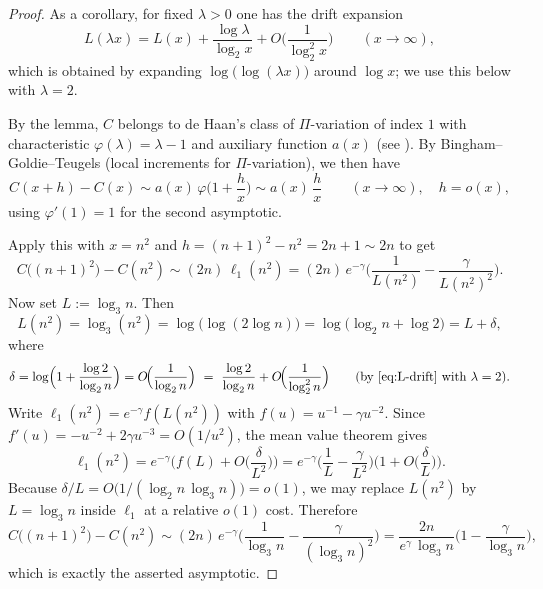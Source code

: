 \begin{proof}
As a corollary, for fixed $\lambda>0$ one has the drift expansion
\begin{equation}\label{eq:L-drift}
 L(\lambda x)=L(x)+\frac{\log\lambda}{\log_2 x}+O\!\Big(\frac{1}{\log_2^2 x}\Big)\qquad(x\to\infty),
\end{equation}
which is obtained by expanding $\log\bigl(\log(\lambda x)\bigr)$ around $\log x$; we use this below with $\lambda=2$.

By the lemma, $C$ belongs to de Haan's class of $\Pi$-variation of index $1$ with characteristic $\varphi(\lambda)=\lambda-1$ and auxiliary function $a(x)$ (see \cite[\S3.7]{BGT1989}). By Bingham--Goldie--Teugels \cite[Th.~3.7.2]{BGT1989} (local increments for $\Pi$-variation), we then have
\[
 C(x+h)-C(x)\sim a(x)\,\varphi\!\Big(1+\frac{h}{x}\Big)\sim a(x)\,\frac{h}{x}
 \qquad (x\to\infty),\quad h=o(x),
\]
using $\varphi'(1)=1$ for the second asymptotic.

Apply this with $x=n^2$ and $h=(n+1)^2-n^2=2n+1\sim 2n$ to get
\[
 C\big((n+1)^2\big)-C(n^2)\sim (2n)\,\ell_1(n^2)
 =(2n)\,e^{-\gamma}\Big(\frac{1}{L(n^2)}-\frac{\gamma}{L(n^2)^2}\Big).
\]
Now set $L:=\log_3 n$. Then
\[
 L(n^2)=\log_3(n^2)=\log\bigl(\log(2\log n)\bigr)=\log\bigl(\log_2 n+\log 2\bigr)
 = L + \delta,
\]
where
\[
 \delta=\log\Bigl(1+\frac{\log 2}{\log_2 n}\Bigr)=O\!\Big(\frac{1}{\log_2 n}\Big)
 \ =\ \frac{\log 2}{\log_2 n}+O\!\Big(\frac{1}{\log_2^2 n}\Big)\qquad\text{(by \eqref{eq:L-drift} with $\lambda=2$).}
\]
Write $\ell_1(n^2)=e^{-\gamma}f(L(n^2))$ with $f(u)=u^{-1}-\gamma u^{-2}$. Since $f'(u)=-u^{-2}+2\gamma u^{-3}=O(1/u^2)$, the mean value theorem gives
\[
 \ell_1(n^2)=e^{-\gamma}\Big(f(L)+O\Big(\frac{\delta}{L^2}\Big)\Big)
 =e^{-\gamma}\Big(\frac{1}{L}-\frac{\gamma}{L^2}\Big)\Big(1+O\Big(\frac{\delta}{L}\Big)\Big).
\]
Because $\delta/L=O\big(1/(\log_2 n\,\log_3 n)\big)=o(1)$, we may replace $L(n^2)$ by $L=\log_3 n$ inside $\ell_1$ at a relative $o(1)$ cost. Therefore
\[
 C\big((n+1)^2\big)-C(n^2)
 \sim (2n)\,e^{-\gamma}\Big(\frac{1}{\log_3 n}-\frac{\gamma}{(\log_3 n)^2}\Big)
 =\frac{2n}{e^{\gamma}\,\log_3 n}\Big(1-\frac{\gamma}{\log_3 n}\Big),
\]
which is exactly the asserted asymptotic.
\end{proof}
